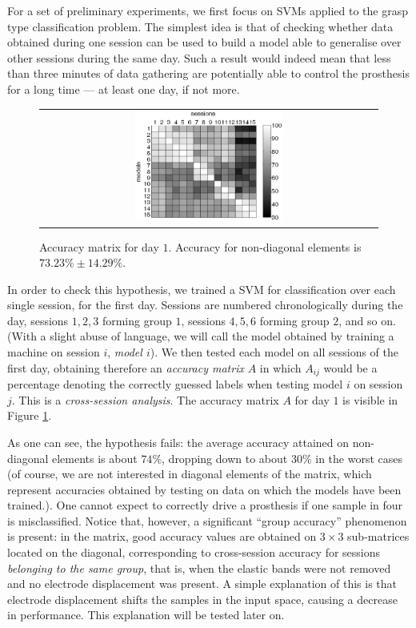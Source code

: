 For a set of preliminary experiments, we first focus on SVMs applied
to the grasp type classification problem. The simplest idea is that of
checking whether data obtained during one session can be used to build
a model able to generalise over other sessions during the same
day. Such a result would indeed mean that less than three minutes of
data gathering are potentially able to control the prosthesis for a
long time --- at least one day, if not more.

\begin{figure}[!ht] \centering
  \begin{tabular}{c}
    \includegraphics[width=0.45\textwidth]{figs/fig_resCross1_full.eps}
  \end{tabular}
  \caption{Accuracy matrix for day $1$. Accuracy for non-diagonal
    elements is $73.23\% \pm 14.29\%$.}
  \label{fig:cross_first}
\end{figure}

In order to check this hypothesis, we trained a SVM for classification
over each single session, for the first day. Sessions are numbered
chronologically during the day, sessions $1,2,3$ forming group $1$,
sessions $4,5,6$ forming group $2$, and so on. (With a slight abuse of
language, we will call the model obtained by training a machine on
session $i$, \emph{model $i$}). We then tested each model on all
sessions of the first day, obtaining therefore an \emph{accuracy
matrix} $A$ in which $A_{ij}$ would be a percentage denoting the
correctly guessed labels when testing model $i$ on session $j$. This
is a \emph{cross-session analysis}. The accuracy matrix $A$ for day
$1$ is visible in Figure \ref{fig:cross_first}.

As one can see, the hypothesis fails: the average accuracy attained on
non-diagonal elements is about $74\%$, dropping down to about $30\%$
in the worst cases (of course, we are not interested in diagonal
elements of the matrix, which represent accuracies obtained by testing
on data on which the models have been trained.). One cannot expect to
correctly drive a prosthesis if one sample in four is
misclassified. Notice that, however, a significant ``group accuracy''
phenomenon is present: in the matrix, good accuracy values are
obtained on $3\times3$ sub-matrices located on the diagonal,
corresponding to cross-session accuracy for sessions \emph{belonging
to the same group}, that is, when the elastic bands were not removed
and no electrode displacement was present. A simple explanation of
this is that electrode displacement shifts the samples in the input
space, causing a decrease in performance. This explanation will be
tested later on.

